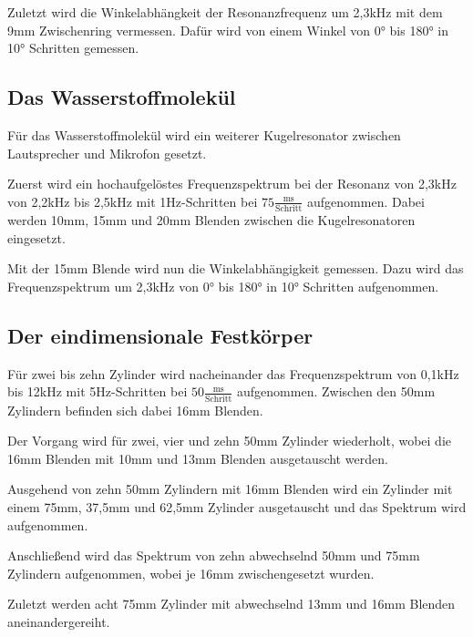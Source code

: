 \noindent
Zuletzt wird die Winkelabhängkeit der Resonanzfrequenz um 2,3kHz mit dem 9mm Zwischenring vermessen.
Dafür wird von einem Winkel von 0° bis 180° in 10° Schritten gemessen.

\subsection{Das Wasserstoffmolekül}
\noindent
Für das Wasserstoffmolekül wird ein weiterer Kugelresonator zwischen Lautsprecher und Mikrofon gesetzt.

\noindent
Zuerst wird ein hochaufgelöstes Frequenzspektrum bei der Resonanz von 2,3kHz von 2,2kHz bis 2,5kHz mit 1Hz-Schritten bei $75\frac{\text{ms}}{\text{Schritt}}$ aufgenommen.
Dabei werden 10mm, 15mm und 20mm Blenden zwischen die Kugelresonatoren eingesetzt.

\noindent
Mit der 15mm Blende wird nun die Winkelabhängigkeit gemessen.
Dazu wird das Frequenzspektrum um 2,3kHz von 0° bis 180° in 10° Schritten aufgenommen.

\subsection{Der eindimensionale Festkörper}
\label{fkp}

\noindent
Für zwei bis zehn Zylinder wird nacheinander das Frequenzspektrum von 0,1kHz bis 12kHz mit 5Hz-Schritten bei $50\frac{\text{ms}}{\text{Schritt}}$ aufgenommen.
Zwischen den 50mm Zylindern befinden sich dabei 16mm Blenden.

\noindent
Der Vorgang wird für zwei, vier und zehn 50mm Zylinder wiederholt, wobei die 16mm Blenden mit 10mm und 13mm Blenden ausgetauscht werden.

\noindent
Ausgehend von zehn 50mm Zylindern mit 16mm Blenden wird ein Zylinder mit einem 75mm, 37,5mm und 62,5mm Zylinder ausgetauscht und das Spektrum wird aufgenommen.

\noindent
Anschließend wird das Spektrum von zehn abwechselnd 50mm und 75mm Zylindern aufgenommen, wobei je 16mm zwischengesetzt wurden.

\noindent
Zuletzt werden acht 75mm Zylinder mit abwechselnd 13mm und 16mm Blenden aneinandergereiht.



